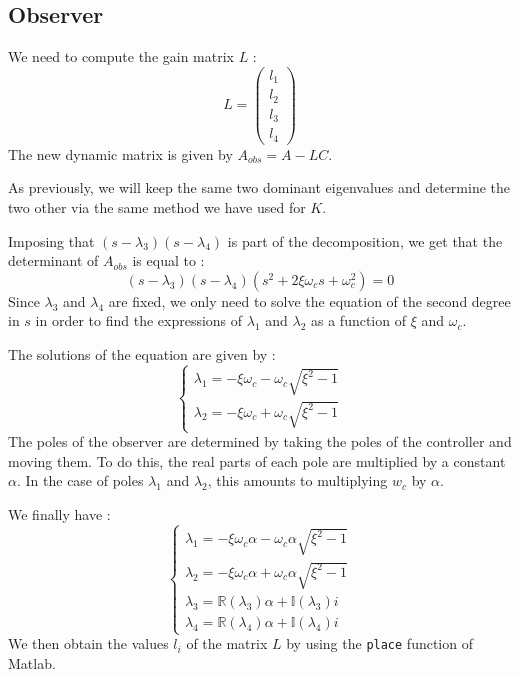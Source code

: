 \subsection{Observer}
We need to compute the gain matrix $L$ :
$$
L = \begin{pmatrix}
    l_1\\
    l_2\\
    l_3\\
    l_4
\end{pmatrix}
$$
The new dynamic matrix is given by $A_{obs} = A - LC$.\par
As previously, we will keep the same two dominant eigenvalues and determine the two other via the same method we have used for $K$.\par
Imposing that $(s - \lambda_3)(s - \lambda_4)$ is part of the decomposition, we get that the determinant of $A_{obs}$ is equal to :
$$
(s - \lambda_3)(s - \lambda_4)(s^2 + 2 \xi\omega_c s + \omega_c^2) = 0
$$
Since $\lambda_3$ and $\lambda_4$ are fixed, we only need to solve the equation of the second degree in $s$ in order to find the expressions of $\lambda_1$ and $\lambda_2$ as a function of $\xi$ and $\omega_c$.\par
The solutions of the equation are given by :
$$
\begin{cases}
    \lambda_1 = -\xi\omega_c - \omega_c\sqrt{\xi^2 - 1}\\
    \lambda_2 = -\xi\omega_c + \omega_c\sqrt{\xi^2 - 1}
\end{cases}
$$
The poles of the observer are determined by taking the poles of the controller and moving them. To do this, the real parts of each pole are multiplied by a constant $\alpha$. In the case of poles $\lambda_1$ and $\lambda_2$, this amounts to multiplying $w_c$ by $\alpha$.\par
We finally have :
$$
\begin{cases}
    \lambda_1 = -\xi\omega_c\alpha - \omega_c\alpha\sqrt{\xi^2 - 1}\\
    \lambda_2 = -\xi\omega_c\alpha + \omega_c\alpha\sqrt{\xi^2 - 1}\\
    \lambda_3 = \mathbb{R}(\lambda_3)\alpha + \mathbb{I}(\lambda_3)i\\
    \lambda_4 = \mathbb{R}(\lambda_4)\alpha + \mathbb{I}(\lambda_4)i
\end{cases}
$$
We then obtain the values $l_i$ of the matrix $L$ by using the \texttt{place} function of Matlab.
